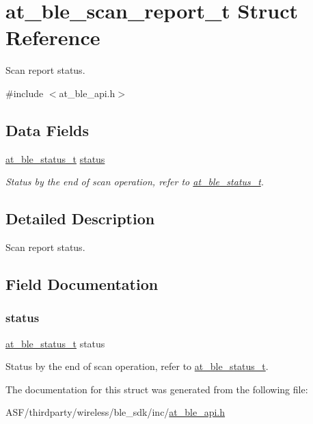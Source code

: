 \hypertarget{structat__ble__scan__report__t}{}\section{at\+\_\+ble\+\_\+scan\+\_\+report\+\_\+t Struct Reference}
\label{structat__ble__scan__report__t}


Scan report status.  




{\ttfamily \#include $<$at\+\_\+ble\+\_\+api.\+h$>$}

\subsection*{Data Fields}
\begin{DoxyCompactItemize}
\item 
\mbox{\hyperlink{group__error__codes__group_ga3b1db9b95feb157b3c188ca27fe76988}{at\+\_\+ble\+\_\+status\+\_\+t}} \mbox{\hyperlink{structat__ble__scan__report__t_a0b48093fc2030779fc47e5216f8019e2}{status}}
\begin{DoxyCompactList}\small\item\em Status by the end of scan operation, refer to \mbox{\hyperlink{at__ble__api_8h_ace24eb4e5ca3f325c663b809da5feb92}{at\+\_\+ble\+\_\+status\+\_\+t}}. \end{DoxyCompactList}\end{DoxyCompactItemize}


\subsection{Detailed Description}
Scan report status. 

\subsection{Field Documentation}
\mbox{\label{structat__ble__scan__report__t_a0b48093fc2030779fc47e5216f8019e2}} 
\subsubsection{\texorpdfstring{status}{status}}
{\footnotesize\ttfamily \mbox{\hyperlink{group__error__codes__group_ga3b1db9b95feb157b3c188ca27fe76988}{at\+\_\+ble\+\_\+status\+\_\+t}} status}



Status by the end of scan operation, refer to \mbox{\hyperlink{at__ble__api_8h_ace24eb4e5ca3f325c663b809da5feb92}{at\+\_\+ble\+\_\+status\+\_\+t}}. 



The documentation for this struct was generated from the following file\+:\begin{DoxyCompactItemize}
\item 
A\+S\+F/thirdparty/wireless/ble\+\_\+sdk/inc/\mbox{\hyperlink{at__ble__api_8h}{at\+\_\+ble\+\_\+api.\+h}}\end{DoxyCompactItemize}
